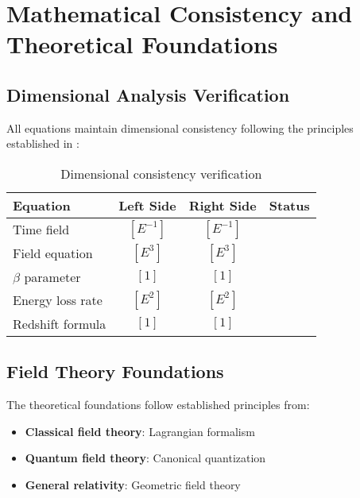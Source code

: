 \documentclass[12pt,a4paper]{article}
\begin{document}
	\section{Mathematical Consistency and Theoretical Foundations}
	\label{sec:mathematical_consistency}
	
	\subsection{Dimensional Analysis Verification}
	\label{subsec:dimensional_verification}
	
	All equations maintain dimensional consistency following the principles established in \citep{barenblatt1996,bridgman1922}:
	
	\begin{table}[htbp]
		\centering
		\begin{tabular}{lccl}
			\toprule
			\textbf{Equation} & \textbf{Left Side} & \textbf{Right Side} & \textbf{Status} \\
			\midrule
			Time field & $[E^{-1}]$ & $[E^{-1}]$ & \checkmark \\
			Field equation & $[E^3]$ & $[E^3]$ & \checkmark \\
			$\beta$ parameter & $[1]$ & $[1]$ & \checkmark \\
			Energy loss rate & $[E^2]$ & $[E^2]$ & \checkmark \\
			Redshift formula & $[1]$ & $[1]$ & \checkmark \\
			\bottomrule
		\end{tabular}
		\caption{Dimensional consistency verification}
		\label{tab:dimensional_check}
	\end{table}
	
	\subsection{Field Theory Foundations}
	\label{subsec:field_theory_foundations}
	
	The theoretical foundations follow established principles from:
	\begin{itemize}
		\item \textbf{Classical field theory}: Lagrangian formalism \citep{goldstein2001,landau1975}
		\item \textbf{Quantum field theory}: Canonical quantization \citep{peskin1995,weinberg1995}
		\item \textbf{General relativity}: Geometric field theory \citep{misner1973,carroll2004}
	\end{itemize}
	
\end{document}
